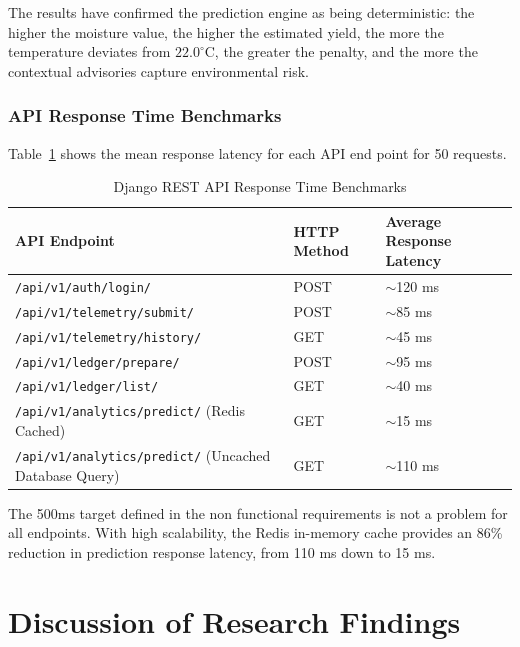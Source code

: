 The results have confirmed the prediction engine as being deterministic: the higher the moisture value, the higher the estimated yield, the more the temperature deviates from $22.0^\circ$C, the greater the penalty, and the more the contextual advisories capture environmental risk.

\subsubsection*{API Response Time Benchmarks}

Table~\ref{tab:api_perf} shows the mean response latency for each API end point for 50 requests.

\begin{table}[H]
\centering
\small
\singlespacing
\renewcommand{\arraystretch}{1.15}
\caption{Django REST API Response Time Benchmarks}
\label{tab:api_perf}
\begin{tabularx}{\textwidth}{|>{\raggedright\arraybackslash}X|l|l|}
\hline
\textbf{API Endpoint} & \textbf{HTTP Method} & \textbf{Average Response Latency} \\
\hline
\texttt{/api/v1/auth/login/} & POST & $\sim$120 ms \\
\hline
\texttt{/api/v1/telemetry/submit/} & POST & $\sim$85 ms \\
\hline
\texttt{/api/v1/telemetry/history/} & GET & $\sim$45 ms \\
\hline
\texttt{/api/v1/ledger/prepare/} & POST & $\sim$95 ms \\
\hline
\texttt{/api/v1/ledger/list/} & GET & $\sim$40 ms \\
\hline
\texttt{/api/v1/analytics/predict/} (Redis Cached) & GET & $\sim$15 ms \\
\hline
\texttt{/api/v1/analytics/predict/} (Uncached Database Query) & GET & $\sim$110 ms \\
\hline
\end{tabularx}
\end{table}

The 500ms target defined in the non functional requirements is not a problem for all endpoints. With high scalability, the Redis in-memory cache provides an 86\% reduction in prediction response latency, from 110 ms down to 15 ms.

\section{Discussion of Research Findings}
\label{sec:discussion}

